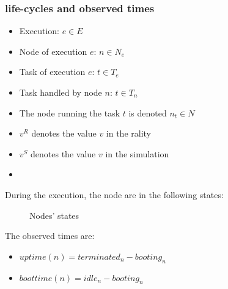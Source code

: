 \subsubsection{life-cycles and observed times}

\begin{itemize}
 \item Execution: $e \in E$
 \item Node of execution $e$: $n \in N_e$
 \item Task of execution $e$: $t \in T_e$
 \item Task handled by node $n$: $t \in T_n$
 \item The node running the task $t$ is denoted $n_t \in N$
 \item $v^R$ denotes the value $v$ in the rality
 \item $v^S$ denotes the value $v$ in the simulation
 \item 
\end{itemize}

During the execution, the node are in the following states:

\begin{figure}
\resizebox{\textwidth}{!}{%

}
\caption{Nodes' states}
\end{figure}


\begin{comment}
\begin{enumerate}
 \item Future: Once the decision to start the node is made;
 \item Pending: Once the node is requested to the cloud-kit;
 \item Booting: Once the cloud-kit aknowledge the satisfaction of the request;
 \item Idle: Once the node is ready to run tasks;
 \item Busy: Once the node is running one task;
 \item ShuttingDown: Once the termination of the node is aked to the cloud-kit;
 \item Terminated: Once the node is terminated.
\end{enumerate}
\end{comment}


The observed times are:
\begin{itemize}
 \item $uptime(n) = terminated_n - booting_n$ 
 \item $boottime(n) = idle_n - booting_n$ 
\end{itemize}


